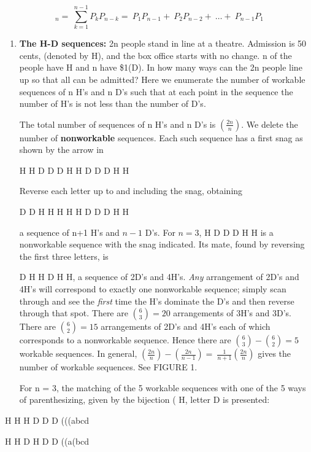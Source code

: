 \documentclass[10pt,letter]{article}
\begin{document}
\[
_{n} = \ \sum_{k = 1}^{n - 1}{P_{k}P_{n - k} = \ P_{1}P_{n - 1} + \ P_{2}P_{n - 2} + \ \ldots + \ P_{n - 1}P_{1}}
\]
\begin{enumerate}
\def\labelenumi{\Roman{enumi}.}

\item
  \textbf{The H-D sequences:} 2n people stand in line at a theatre.
  Admission is 50 cents, (denoted by H), and the box office starts with no
  change. n of the people have H and n have \$1(D). In how many ways can
  the 2n people line up so that all can be admitted? Here we enumerate
  the number of workable sequences of n H's and n D's such that at each
  point in the sequence the number of H's is not less than the number of
  D's.

The total number of sequences of n H's and n D's is
  \(\left( \frac{2n}{n} \right)\). We delete the number of
  \textbf{nonworkable} sequences. Each such sequence has a first snag as
  shown by the arrow in

H H D D D H H D D D H H

Reverse each letter up to and including the snag, obtaining

D D H H H H H D D D H H

a sequence of n+1 H's and \(n - 1\) D's. For \(n = 3\), H D D D H H is
  a nonworkable sequence with the snag indicated. Its mate, found by
  reversing the first three letters, is

D H H D H H, a sequence of 2D's and 4H's. \emph{Any} arrangement of
  2D's and 4H's will correspond to exactly one nonworkable sequence;
  simply scan through and see the \emph{first} time the H's dominate the
  D's and then reverse through that spot. There are
  \(\binom{6}{3}
 = 20\) arrangements of 3H's and 3D's. There are
  \(\binom{6}{2}
 = 15\) arrangements of 2D's and 4H's each of which
  corresponds to a nonworkable sequence. Hence there are
  \(\binom{6}{3}
 -\binom{6}{2}
 = 5\) workable sequences. In general,
  \(\left( \frac{2n}{n} \right) - \left( \frac{2n}{n - 1} \right) = \ \frac{1}{n + 1}\left( \frac{2n}{n} \right)\)
  gives the number of workable sequences. See FIGURE 1.

For n = 3, the matching of the 5 workable sequences with one of the 5
  ways of parenthesizing, given by the bijection ( H, letter  D is
  presented:

\end{enumerate}

H H H D D D   (((abcd

H H D H D D   ((a(bcd
\end{document}
